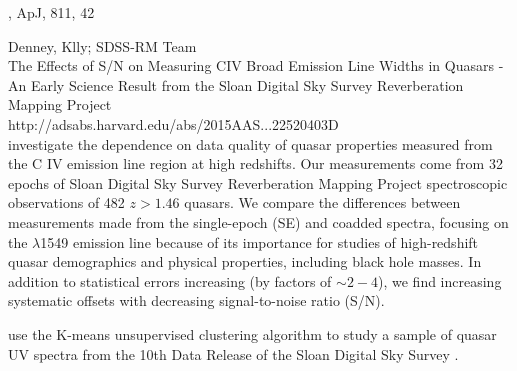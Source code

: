 \documentclass[a4paper,fleqn,usenatbib]{mnras}
\begin{document}
\citet{Bian2012}

\citet{Sun2015} , ApJ, 811, 42

\citet{Grier2015}

Denney, Klly; SDSS-RM Team \\
The Effects of S/N on Measuring CIV Broad Emission Line Widths in Quasars - An Early Science Result from the Sloan Digital Sky Survey Reverberation Mapping Project\\
http://adsabs.harvard.edu/abs/2015AAS...22520403D\\

\citet{Denney2016} investigate the dependence on data quality of quasar properties
measured from the C IV emission line region at high redshifts.  Our
measurements come from 32 epochs of Sloan Digital Sky Survey
Reverberation Mapping Project spectroscopic observations of 482 $z >
1.46$ quasars. We compare the differences between measurements made
from the single-epoch (SE) and coadded spectra, focusing on the \civ
$\lambda$1549 emission line because of its importance for studies of
high-redshift quasar demographics and physical properties, including
black hole masses. In addition to statistical errors increasing (by
factors of $\sim2-4$), we find increasing systematic offsets with
decreasing signal-to-noise ratio (S/N).


\citet{Ge2016} 

\citep{Tammour2016} use the K-means unsupervised clustering algorithm 
to study a sample of quasar UV spectra from the 10th Data Release of the Sloan Digital Sky Survey
\citep[SDSS-DR10Q; ][]{Paris2014}. 
\end{document}

